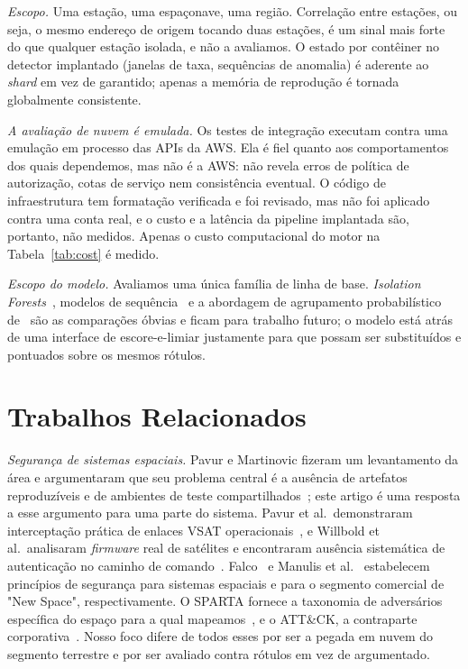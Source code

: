 \documentclass[conference]{IEEEtran}
\begin{document}
\emph{Escopo.} Uma estação, uma espaçonave, uma região. Correlação entre
estações, ou seja, o mesmo endereço de origem tocando duas estações, é um
sinal mais forte do que qualquer estação isolada, e não a avaliamos. O estado por
contêiner no detector implantado (janelas de taxa, sequências de anomalia) é
aderente ao \emph{shard} em vez de garantido; apenas a memória de reprodução é
tornada globalmente consistente.

\emph{A avaliação de nuvem é emulada.} Os testes de integração executam contra
uma emulação em processo das APIs da AWS. Ela é fiel quanto aos comportamentos
dos quais dependemos, mas não é a AWS: não revela erros de política de
autorização, cotas de serviço nem consistência eventual. O código de
infraestrutura tem formatação verificada e foi revisado, mas não foi aplicado
contra uma conta real, e o custo e a latência da pipeline implantada são,
portanto, não medidos. Apenas o custo computacional do motor na
Tabela~\ref{tab:cost} é medido.

\emph{Escopo do modelo.} Avaliamos uma única família de linha de base.
\emph{Isolation Forests}~\cite{liu2008isolation}, modelos de
sequência~\cite{hundman2018lstm} e a abordagem de agrupamento probabilístico
de~\cite{yairi2017datadriven} são as comparações óbvias e ficam para trabalho
futuro; o modelo está atrás de uma interface de escore-e-limiar justamente para
que possam ser substituídos e pontuados sobre os mesmos rótulos.

\section{Trabalhos Relacionados}

\emph{Segurança de sistemas espaciais.} Pavur e Martinovic fizeram um
levantamento da área e argumentaram que seu problema central é a ausência de
artefatos reproduzíveis e de ambientes de teste
compartilhados~\cite{pavur2020sok}; este artigo é uma resposta a esse argumento
para uma parte do sistema. Pavur et al.\ demonstraram interceptação prática de
enlaces VSAT operacionais~\cite{pavur2020vsat}, e Willbold et al.\ analisaram
\emph{firmware} real de satélites e encontraram ausência sistemática de
autenticação no caminho de comando~\cite{willbold2023space}.
Falco~\cite{falco2019principles} e Manulis et al.~\cite{manulis2021newspace}
estabelecem princípios de segurança para sistemas espaciais e para o segmento
comercial de "New Space", respectivamente. O SPARTA fornece a taxonomia de
adversários específica do espaço para a qual mapeamos~\cite{sparta}, e o
ATT\&CK, a contraparte corporativa~\cite{attack}. Nosso foco difere de todos
esses por ser a pegada em nuvem do segmento terrestre e por ser avaliado contra
rótulos em vez de argumentado.
\end{document}
